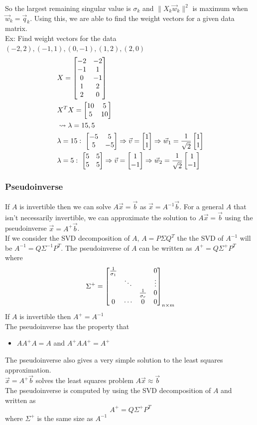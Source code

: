 \documentclass[11pt, fleqn]{article}
\begin{document}
So the largest remaining singular value is $\sigma_k$ and $\|X_k\vec{w}_k\|^2$ is maximum when $\vec{w}_k=\vec{q}_k$. Using this, we are able to find the weight vectors for a given data matrix.\\
Ex: Find weight vectors for the data $(-2,2),(-1,1),(0,-1),(1,2),(2,0)$
\begin{align*}
    &X=\matrixx{-2&-2\\-1&1\\0&-1\\1&2\\2&0}\\
    &X^TX=\matrixx{10 & 5\\ 5& 10}\\
    &\leadsto \lambda=15,5\\
    &\lambda=15:\ \matrixx{-5&5\\5&-5}\Ra \vec{v}=\matrixx{1\\1}\Ra \vec{w}_1=\frac{1}{\sqrt{2}}\matrixx{1\\1}\\
    &\lambda=5:\ \matrixx{5&5\\5&5}\Ra \vec{v}=\matrixx{1\\-1}\Ra \vec{w}_2=\frac{1}{\sqrt{2}}\matrixx{1\\-1}
\end{align*}

\subsubsection{Pseudoinverse}
If $A$ is invertible then we can solve $A\vec{x}=\vec{b}$ as $\vec{x}=A^{-1}\vec{b}$. For a general $A$ that isn't necessarily invertible, we can approximate the solution to $A\vec{x}=\vec{b}$ using the pseudoinverse $\vec{x}=A^+\vec{b}$.\\
If we consider the SVD decomposition of $A$, $A=P\Sigma Q^T$ the the SVD of $A^{-1}$ will be $A^{-1}=Q\Sigma^{-1}P^T$. The pseudoinverse of $A$ can be written as $A^+=Q\Sigma^+P^T$ where
$$\Sigma^+=\matrixx{\frac{1}{\sigma_1} & & & 0\\ & \ddots & & \vdots\\ & & \frac{1}{\sigma_r} & 0\\ 0 & \cdots & 0 & 0}_{n\times m}$$
If $A$ is invertible then $A^+=A^{-1}$\\
The pseudoinverse has the property that
\begin{itemize}
    \item $AA^+A=A$ and $A^+AA^+=A^+$
\end{itemize}
The pseudoinverse also gives a very simple solution to the least squares approximation.\\
$\vec{x}=A^+\vec{b}$ solves the least squares problem $A\vec{x}\approx\vec{b}$\\
The pseudoinverse is computed by using the SVD decomposition of $A$ and written as
$$A^+=Q\Sigma^+ P^T$$
where $\Sigma^+$ is the same size as $A^{-1}$
\end{document}
